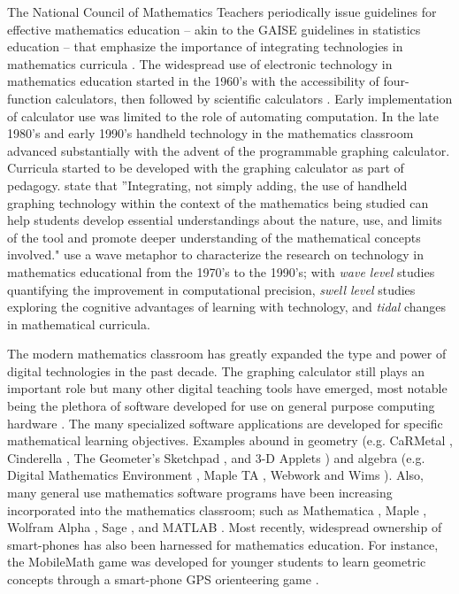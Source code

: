 \documentclass[11pt]{isuthesis}\usepackage[]{graphicx}\usepackage[]{color}
\begin{document}
The National Council of Mathematics Teachers periodically issue guidelines for effective mathematics education -- akin to the GAISE guidelines in statistics education -- that emphasize the importance of integrating technologies in mathematics curricula \citep{nctm2000standards}. The widespread use of electronic technology in mathematics education started in the 1960's with the accessibility of four-function calculators, then followed by scientific calculators \citep{trouche2010handheld}. Early implementation of calculator use was limited to the role of automating computation. In the late 1980's and early 1990's handheld technology in the mathematics classroom advanced substantially with the advent of the programmable graphing calculator. Curricula started to be developed with the graphing calculator as part of pedagogy. \citet{burrill2002handheld} state that ''Integrating, not simply adding, the use of handheld graphing technology within the context of the mathematics being studied can help students develop essential understandings about the nature, use, and limits of the tool and promote deeper understanding of the mathematical concepts involved." \citet{kaput1994technology} use a wave metaphor to characterize the research on technology in mathematics educational from the 1970's to the 1990's; with \textit{wave level} studies quantifying the improvement in computational precision, \textit{swell level} studies exploring the cognitive advantages of learning with technology, and \textit{tidal} changes in mathematical curricula.  

The modern mathematics classroom has greatly expanded the type and power of digital technologies in the past decade. The graphing calculator still plays an important role but many other digital teaching tools have emerged, most notable being the plethora of software developed for use on general purpose computing hardware \citep{trouche2010handheld}. The many specialized software applications are developed for specific mathematical learning objectives. Examples abound in geometry (e.g. CaRMetal \citep{CaRMetal}, Cinderella \citep{cinderella}, The Geometer's Sketchpad \citep{jackiw2002geometer}, and 3-D Applets \citep{boon2009designer}) and algebra (e.g. Digital Mathematics Environment \citep{DME}, Maple TA \citep{MapleTA}, Webwork \citep{gage2002webwork} and Wims \citep{wims}). Also, many general use mathematics software programs have been increasing incorporated into the mathematics classroom; such as Mathematica \citep{Mathematica}, Maple \citep{Maple}, Wolfram Alpha \citep{wolframalpha}, Sage \citep{sage}, and MATLAB \citep{MATLAB}. Most recently, widespread ownership of smart-phones has also been harnessed for mathematics education. For instance, the MobileMath game was developed for younger students to learn geometric concepts through a smart-phone GPS orienteering game \citep{wijers2010mobilemath}. 
\end{document}
